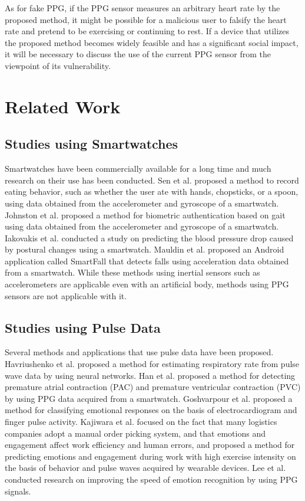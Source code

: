 \documentclass[sigconf]{acmart}
\begin{document}
As for fake PPG, if the PPG sensor measures an arbitrary heart rate by the proposed method, it might be possible for a malicious user to falsify the heart rate and pretend to be exercising or continuing to rest. If a device that utilizes the proposed method becomes widely feasible and has a significant social impact, it will be necessary to discuss the use of the current PPG sensor from the viewpoint of its vulnerability.



\section{Related Work}
\label{sec:related}

\subsection{Studies using Smartwatches}
Smartwatches have been commercially available for a long time and much research on their use has been conducted.
Sen et al. \cite{eating_recognition} proposed a method to record eating behavior, such as whether the user ate with hands, chopsticks, or a spoon, using data obtained from the accelerometer and gyroscope of a smartwatch.
Johnston et al. \cite{smartwatch_walk_authentication} proposed a method for biometric authentication based on gait using data obtained from the accelerometer and gyroscope of a smartwatch.
Iakovakis et al. \cite{oh_detection} conducted a study on predicting the blood pressure drop caused by postural changes using a smartwatch.
Mauldin et al. \cite{smartfall} proposed an Android application called SmartFall that detects falls using acceleration data obtained from a smartwatch.
While these methods using inertial sensors such as accelerometers are applicable even with an artificial body, methods using PPG sensors are not applicable with it.


\subsection{Studies using Pulse Data}
Several methods and applications that use pulse data have been proposed.
Havriushenko et al. \cite{respiratory_rate_estimation} proposed a method for estimating respiratory rate from pulse wave data by using neural networks.
Han et al. \cite{arrhythmia_detection} proposed a method for detecting premature atrial contraction (PAC) and premature ventricular contraction (PVC) by using PPG data acquired from a smartwatch.
Goshvarpour et al. \cite{emotion_recognition_poincare} proposed a method for classifying emotional responses on the basis of electrocardiogram and finger pulse activity.
Kajiwara et al. \cite{pulse_order_picking} focused on the fact that many logistics companies adopt a manual order picking system, and that emotions and engagement affect work efficiency and human errors, and proposed a method for predicting emotions and engagement during work with high exercise intensity on the basis of behavior and pulse waves acquired by wearable devices.
Lee et al. \cite{fast_emotion_recognition} conducted research on improving the speed of emotion recognition by using PPG signals.\par
\end{document}

